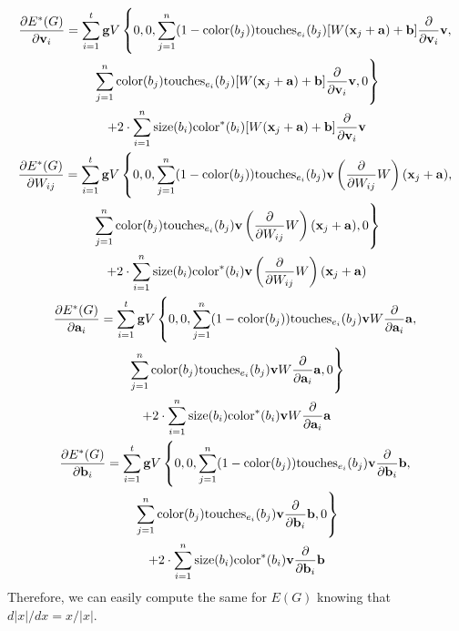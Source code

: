 \documentclass{amsart}
\def\v#1{\mathbf{#1}}
\begin{document}
\begin{gather*}
\frac{ \partial E^*(G) }{ \partial \v{ v }_i } = \sum_{ i = 1 }^t \v{ g } V
  \left\{ 0, 0, \sum_{ j = 1 }^n (1 - \color{ b_j }) \touches{ e_i }{ b_j } [W(\v{ x }_j + \v{ a }) + \v{ b }]
  \frac{ \partial }{ \partial \v{ v }_i } \v{ v },\right.\\
  \left.\sum_{ j = 1 }^n \color{ b_j } \touches{ e_i }{ b_j } [W(\v{ x }_j + \v{ a }) + \v{ b }]
  \frac{ \partial }{ \partial \v{ v }_i } \v{ v }, 0 \right\}\\
  + 2 \cdot \sum_{ i = 1 }^n \size{ b_i } \colorp{ b_i }  [W(\v{ x }_j + \v{ a }) + \v{ b }] \frac{ \partial }{ \partial \v{ v }_i } \v{ v }\\
\frac{ \partial E^*(G) }{ \partial W_{ i j } }  = \sum_{ i = 1 }^t \v{ g } V
  \left\{ 0, 0, \sum_{ j = 1 }^n (1 - \color{ b_j }) \touches{ e_i }{ b_j } \v{ v }
  \left(\frac{ \partial }{ \partial W_{ i j } } W\right) (\v{ x }_j + \v{ a }),\right.\\
  \left.\sum_{ j = 1 }^n \color{ b_j } \touches{ e_i }{ b_j } \v{ v }
  \left(\frac{ \partial }{ \partial W_{ i j } } W\right) (\v{ x }_j + \v{ a }), 0 \right\}\\
  + 2 \cdot \sum_{ i = 1 }^n \size{ b_i } \colorp{ b_i }  \v{ v }
  \left(\frac{ \partial }{ \partial W_{ i j } } W\right) (\v{ x }_j + \v{ a })\\
\frac{ \partial E^*(G) }{ \partial \v{ a }_i } = \sum_{ i = 1 }^t \v{ g } V
  \left\{ 0, 0, \sum_{ j = 1 }^n (1 - \color{ b_j }) \touches{ e_i }{ b_j }
  \v{ v } W \frac{ \partial }{ \partial \v{ a }_i } \v{ a },\right.\\
  \left.\sum_{ j = 1 }^n \color{ b_j } \touches{ e_i }{ b_j }
  \v{ v } W \frac{ \partial }{ \partial \v{ a }_i } \v{ a }, 0 \right\}\\
  + 2 \cdot \sum_{ i = 1 }^n \size{ b_i } \colorp{ b_i } \v{ v } W \frac{ \partial }{ \partial \v{ a }_i } \v{ a }\\
\frac{ \partial E^*(G) }{ \partial \v{ b }_i } = \sum_{ i = 1 }^t \v{ g } V
  \left\{ 0, 0, \sum_{ j = 1 }^n (1 - \color{ b_j }) \touches{ e_i }{ b_j }
  \v{ v } \frac{ \partial }{ \partial \v{ b }_i } \v{ b },\right.\\
  \left.\sum_{ j = 1 }^n \color{ b_j } \touches{ e_i }{ b_j }
  \v{ v } \frac{ \partial }{ \partial \v{ b }_i } \v{ b }, 0 \right\}\\
  + 2 \cdot \sum_{ i = 1 }^n \size{ b_i } \colorp{ b_i } \v{ v } \frac{ \partial }{ \partial \v{ b }_i } \v{ b }
\end{gather*}
Therefore, we can easily compute the same for $E(G)$ knowing that $d |x| / dx = x / |x|$.
\end{document}
